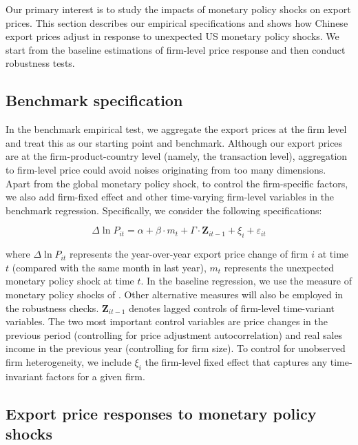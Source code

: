 Our primary interest is to study the impacts of monetary policy shocks on export prices. This section describes our empirical specifications and shows how Chinese export prices adjust in response to unexpected US monetary policy shocks. We start from the baseline estimations of firm-level price response and then conduct robustness tests.

\subsection{Benchmark specification}

In the benchmark empirical test, we aggregate the export prices at the firm level and treat this as our starting point and benchmark. Although our export prices are at the firm-product-country level (namely, the transaction level), aggregation to firm-level price could avoid noises originating from too many dimensions. Apart from the global monetary policy shock, to control the firm-specific factors, we also add firm-fixed effect and other time-varying firm-level variables in the benchmark regression. Specifically, we consider the following specifications:

\begin{equation}
    \Delta \ln P_{it} = \alpha+\beta \cdot m_{t}+ \Gamma \cdot \textbf{Z}_{it-1}+\xi_{i}+\varepsilon_{it}
\end{equation}

where $\Delta \ln P_{it}$ represents the year-over-year export price change of firm $i$ at time $t$ (compared with the same month in last year), $m_t$ represents the unexpected monetary policy shock at time $t$. In the baseline regression, we use the measure of monetary policy shocks of \cite{bu2021unified}. Other alternative measures will also be employed in the robustness checks. $\textbf{Z}_{it-1}$ denotes lagged controls of firm-level time-variant variables. The two most important control variables are price changes in the previous period (controlling for price adjustment autocorrelation) and real sales income in the previous year (controlling for firm size). To control for unobserved firm heterogeneity, we include $\xi_{i}$ the firm-level fixed effect that captures any time-invariant factors for a given firm.

\subsection{Export price responses to monetary policy shocks}

